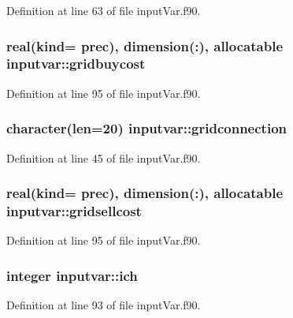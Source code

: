 Definition at line 63 of file input\-Var.\-f90.

\hypertarget{classinputvar_a10f5c69ad85799dd2ae3a39500ba3005}{
\subsubsection[{gridbuycost}]{\setlength{\rightskip}{0pt plus 5cm}real(kind= prec), dimension(\-:), allocatable inputvar\-::gridbuycost}}\label{classinputvar_a10f5c69ad85799dd2ae3a39500ba3005}


Definition at line 95 of file input\-Var.\-f90.

\hypertarget{classinputvar_a8488f705094b7c59cf8cb06939fe9a7a}{
\subsubsection[{gridconnection}]{\setlength{\rightskip}{0pt plus 5cm}character(len=20) inputvar\-::gridconnection}}\label{classinputvar_a8488f705094b7c59cf8cb06939fe9a7a}


Definition at line 45 of file input\-Var.\-f90.

\hypertarget{classinputvar_a2f72c3ce64312b528c0679cbd950fb8f}{
\subsubsection[{gridsellcost}]{\setlength{\rightskip}{0pt plus 5cm}real(kind= prec), dimension(\-:), allocatable inputvar\-::gridsellcost}}\label{classinputvar_a2f72c3ce64312b528c0679cbd950fb8f}


Definition at line 95 of file input\-Var.\-f90.

\hypertarget{classinputvar_a69cdcc78492d1a96e3f02ee2915f207d}{
\subsubsection[{ich}]{\setlength{\rightskip}{0pt plus 5cm}integer inputvar\-::ich}}\label{classinputvar_a69cdcc78492d1a96e3f02ee2915f207d}


Definition at line 93 of file input\-Var.\-f90.

